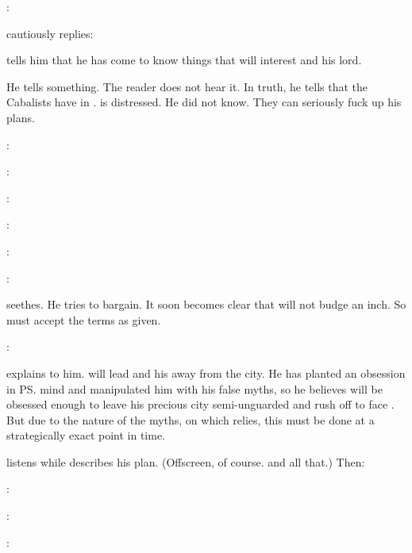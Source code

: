 \Ishnaruchaefir:

\Psyrex cautiously replies:

\Ishnaruchaefir tells him that he has come to know things that will interest \Psyrex and his lord. 

He tells \Psyrex something. 
The reader does not hear it. 
In truth, he tells \Psyrex that the Cabalists have \noggyaleth in \Malcur. 
\Psyrex is distressed.
He did not know. 
They can seriously fuck up his plans.

\Psyrex:

\Ishnaruchaefir:

\Psyrex:

\Ishnaruchaefir:

\Psyrex:

\Ishnaruchaefir:

\Psyrex seethes. 
He tries to bargain.
It soon becomes clear that \Ishnaruchaefir will not budge an inch. 
So \Psyrex must accept the terms as given. 

\Psyrex:

\Ishnaruchaefir explains to him. 
\Ishnaruchaefir will lead \Teshrial and his \noggyaleth away from the city. 
He has planted an obsession in \ps{\Teshrial} mind and manipulated him with his false myths, so he believes \Teshrial{} will be obsessed enough to leave his precious city semi-unguarded and rush off to face \Ishnaruchaefir. 
But due to the nature of the myths, on which \Teshrial{} relies, this must be done at a strategically exact point in time. 

\Psyrex{} listens while \Ishnaruchaefir{} describes his plan. 
(Offscreen, of course. 
  and all that.)
Then:

\Psyrex: 

\Ishnaruchaefir: 

\Psyrex: 

